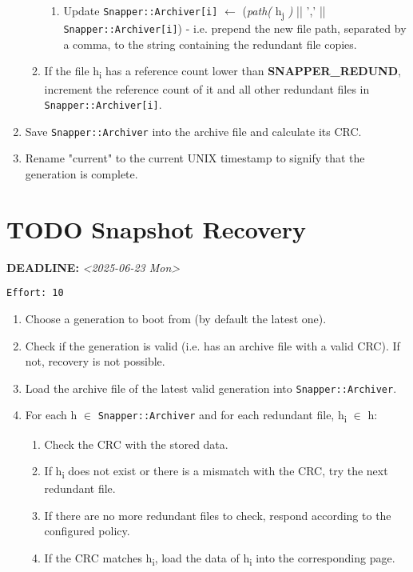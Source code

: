 \documentclass[11pt]{article}
\begin{document}
\begin{enumerate}
\begin{enumerate}
\begin{enumerate}
\item Update \texttt{Snapper::Archiver[i]} \(\gets\) (\emph{path(} h\textsubscript{j} \emph{)} || ',' || \texttt{Snapper::Archiver[i]}) - i.e. prepend the new file path, separated by a comma, to the string containing the redundant file copies.
\end{enumerate}
\item If the file h\textsubscript{i} has a reference count lower than \textbf{SNAPPER\_REDUND}, increment the reference count of it and all other redundant files in \texttt{Snapper::Archiver[i]}.
\end{enumerate}
\item Save \texttt{Snapper::Archiver} into the archive file and calculate its CRC.
\item Rename "current" to the current UNIX timestamp to signify that the generation is complete.
\end{enumerate}
\section{{\bfseries\sffamily TODO}  Snapshot Recovery}
\label{sec:orgb74ba94}
\noindent\textbf{DEADLINE:} \textit{<2025-06-23 Mon>}\\
\begin{verbatim}
Effort: 10
\end{verbatim}
\begin{enumerate}
\item Choose a generation to boot from (by default the latest one).
\item Check if the generation is valid (i.e. has an archive file with a valid CRC). If not, recovery is not possible.
\item Load the archive file of the latest valid generation into \texttt{Snapper::Archiver}.
\item For each h \(\in\) \texttt{Snapper::Archiver} and for each redundant file, h\textsubscript{i} \(\in\) h:
\begin{enumerate}
\item Check the CRC with the stored data.
\item If h\textsubscript{i} does not exist or there is a mismatch with the CRC, try the next redundant file.
\item If there are no more redundant files to check, respond according to the configured policy.
\item If the CRC matches h\textsubscript{i}, load the data of h\textsubscript{i} into the corresponding page.
\end{enumerate}
\end{enumerate}
\end{document}
